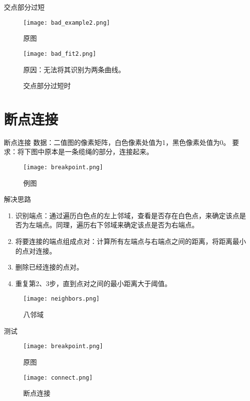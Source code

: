 \documentclass[10pt]{beamer}
\begin{document}
\begin{frame}{交点部分过短}

\begin{figure}[H]
\begin{minipage}{0.48\linewidth}
  \centerline{\texttt{[image: bad\_example2.png]}}
  \caption{原图}
\end{minipage}
\hfill
\begin{minipage}{0.48\linewidth}
  \centerline{\texttt{[image: bad\_fit2.png]}}
  \caption{交点部分过短时}
\end{minipage}

原因：无法将其识别为两条曲线。
\end{figure}
\end{frame}


\section{断点连接}

\begin{frame}{断点连接}
数据：二值图的像素矩阵，白色像素处值为1，黑色像素处值为0。
要求：将下图中原本是一条缆绳的部分，连接起来。
\begin{figure}
  \centerline{\texttt{[image: breakpoint.png]}}
  \caption{例图}
\end{figure}

\end{frame}


\begin{frame}{解决思路}
\begin{enumerate}
\item 识别端点：通过遍历白色点的左上邻域，查看是否存在白色点，来确定该点是否为左端点。同理，遍历右下邻域来确定该点是否为右端点。
\item 将要连接的端点组成点对：计算所有左端点与右端点之间的距离，将距离最小的点对连接。
\item 删除已经连接的点对。
\item 重复第2、3步，直到点对之间的最小距离大于阈值。
\end{enumerate}
\begin{figure}
  \centerline{\texttt{[image: neighbors.png]}}
  \caption{八邻域}
\end{figure}
\end{frame}

\begin{frame}{测试}
\begin{figure}[H]
\begin{minipage}{0.48\linewidth}
  \centerline{\texttt{[image: breakpoint.png]}}
  \caption{原图}
\end{minipage}
\hfill
\begin{minipage}{0.48\linewidth}
  \centerline{\texttt{[image: connect.png]}}
  \caption{断点连接}
\end{minipage}
\end{figure}
\end{frame}
\end{document}
